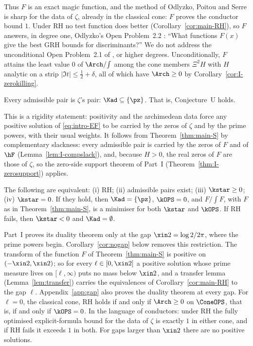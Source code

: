 Thus $F$ is an exact magic function, and the method of Odlyzko, Poitou and Serre is sharp for the data of $\zeta$, already in the classical
cone: $F$ proves the conductor bound $1$. Under RH no test function does better (Corollary~\ref{cor:main-RH}), so $F$ answers, in degree one,
Odlyzko's Open Problem~2.2 \cite[p.~123]{Odl90}: ``What functions $F(x)$ give the best GRH bounds for discriminants?'' We do not address the
unconditional Open Problem~2.1 of \cite{Odl90}, or higher degrees. Unconditionally, $F$ attains the least value $0$ of $\Arch/\!\int$ among the
cone members $\Xi^2H$ with $H$ analytic on a strip $|\Im t|\le\frac12+\delta$, all of which have $\Arch\ge0$ by Corollary~\ref{cor:I-zerokilling}.

\begin{mainthm}\label{thm:main-U}
Every admissible pair is $\zeta$'s pair: $\Kad\subseteq\{\pz\}$. That is, Conjecture~U holds.
\end{mainthm}

This is a rigidity statement: positivity and the archimedean data force any positive solution of \eqref{eq:intro-EF} to be carried by the zeros
of $\zeta$ and by the prime powers, with their usual weights. It follows from Theorem~\ref{thm:main-S} by complementary slackness: every
admissible pair is carried by the zeros of $F$ and of $\hF$ (Lemma~\ref{lem:I-compslack}), and, because $H>0$, the real zeros of $F$ are those
of $\zeta$, so the zero-side support theorem of Part~I (Theorem~\ref{thm:I-zerosupport}) applies.

\begin{maincor}\label{cor:main-RH}
The following are equivalent: \textup{(i)} RH; \textup{(ii)} admissible pairs exist; \textup{(iii)} $\kstar\ge0$; \textup{(iv)} $\kstar=0$. If they
hold, then $\Kad=\{\pz\}$, $\kOPS=0$, and $F/\int F$, with $F$ as in Theorem~\ref{thm:main-S}, is a minimiser for both $\kstar$ and $\kOPS$. If
RH fails, then $\kstar<0$ and $\Kad=\emptyset$.
\end{maincor}

\begin{remark}\label{rem:intro-classical}
Part~I proves its duality theorem only at the gap $\xin2=\log2/2\pi$, where the prime powers begin. Corollary~\ref{cor:nogap} below removes
this restriction. The transform of the function $F$ of Theorem~\ref{thm:main-S} is positive on $(-\xin2,\xin2)$; so for every
$\ell\in[0,\xin2]$ a positive solution whose prime measure lives on $[\ell,\infty)$ puts no mass below $\xin2$, and a transfer lemma
(Lemma~\ref{lem:transfer}) carries the equivalences of Corollary~\ref{cor:main-RH} to the gap $\ell$. Appendix~\ref{app:gap} also proves the
duality theorem at every gap. For $\ell=0$, the classical cone, RH holds if and only if $\Arch\ge0$ on $\ConeOPS$, that is, if and only if
$\kOPS=0$. In the language of conductors: under RH the fully optimised explicit-formula bound for the data of $\zeta$ is exactly $1$ in either
cone, and if RH fails it exceeds $1$ in both. For gaps larger than $\xin2$ there are no positive solutions.
\end{remark}

